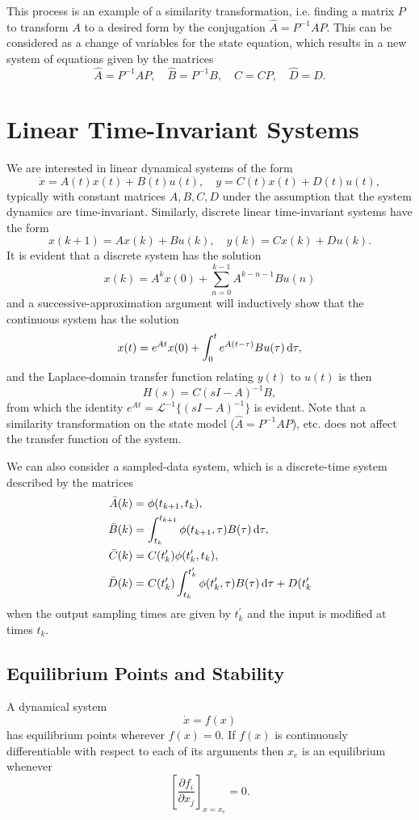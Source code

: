 \documentclass{report}
\begin{document}
This process is an example of a similarity transformation,
i.e. finding a matrix $P$ to transform $A$ to a desired form by the
conjugation $\hat{A} = P^{-1} A P$. This can be considered as a change
of variables for the state equation, which results in a new system of
equations given by the matrices
$$
\hat{A} = P^{-1} A P, \quad
\hat{B} = P^{-1} B, \quad
\hat{C} = C P, \quad
\hat{D} = D.
$$

\section{Linear Time-Invariant Systems}
We are interested in linear dynamical systems of the form
$$
\dot{x} = A(t) x(t) + B(t) u(t), \quad
y = C(t) x(t) + D(t) u(t),
$$
typically with constant matrices $A, B, C, D$ under the assumption
that the system dynamics are time-invariant. Similarly, discrete
linear time-invariant systems have the form
$$
x(k+1) = A x(k) + B u(k), \quad
y(k) = C x(k) + D u(k).
$$
It is evident that a discrete system has the solution
$$
x(k) = A^k x(0) + \sum_{n=0}^{k-1} A^{k-n-1} B u(n)
$$
and a successive-approximation argument will inductively show that the
continuous system has the solution
$$
x(t) = e^{At} x(0) + \int_0^t e^{A(t - \tau)} B u(\tau) \dif \tau,
$$
and the Laplace-domain transfer function relating $y(t)$ to $u(t)$ is then
$$
H(s) = C(sI - A)^{-1} B,
$$
from which the identity $e^{At} = \mathcal{L}^{-1}\{(sI - A)^{-1}\}$
is evident. Note that a similarity transformation on the state model
($\hat{A} = P^{-1} A P$), etc. does not affect the transfer function of
the system.

We can also consider a sampled-data system, which is a discrete-time
system described by the matrices
\begin{align*}
\bar{A}(k) &= \phi(t_{k+1}, t_k), \\
\bar{B}(k) &=
  \int_{t_k}^{t_{k+1}} \phi(t_{k+1}, \tau) B(\tau) \dif\tau, \\
\bar{C}(k) &= C(t_k^\prime)\phi(t_k^\prime, t_k), \\
\bar{D}(k) &=
  C(t_k^\prime)
  \int_{t_k}^{t_k^\prime} \phi(t_k^\prime, \tau) B(\tau) \dif \tau
+ D(t_k^\prime
\end{align*}
when the output sampling times are given by $t_k^\prime$ and the input
is modified at times $t_k$.

\subsection{Equilibrium Points and Stability}
A dynamical system
$$
\dot{x} = f(x)
$$
has equilibrium points wherever $f(x) = 0$. If $f(x)$ is continuously
differentiable with respect to each of its arguments then $x_e$ is an
equilibrium whenever
$$
\left[\frac{\partial f_i}{\partial x_j}\right]_{x = x_e} = 0.
$$
\end{document}
